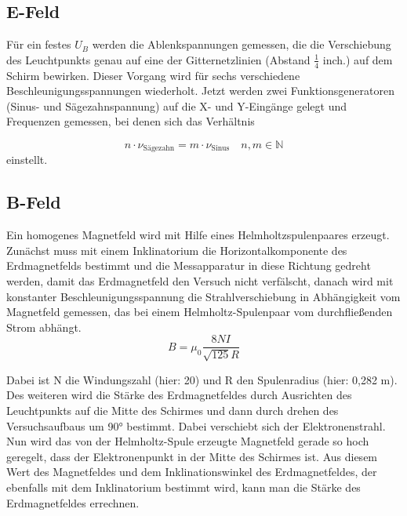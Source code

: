 
\subsection{E-Feld}

Für ein festes $U_B$ werden die Ablenkspannungen gemessen, die die Verschiebung des Leuchtpunkts genau auf eine der Gitternetzlinien (Abstand $\frac{1}{4}$ inch.) auf dem Schirm bewirken. Dieser Vorgang wird für
sechs verschiedene Beschleunigungsspannungen wiederholt.
Jetzt werden zwei Funktionsgeneratoren (Sinus- und Sägezahnspannung) auf die X- und Y-Eingänge gelegt und Frequenzen gemessen, bei denen sich das Verhältnis 

\begin{equation}
\label{eq:Theorie_freqVerhältnis}
n \cdot \nu_\text{Sägezahn} = m \cdot \nu_\text{Sinus} \quad n, m\in\mathbb{N}
\end{equation}
einstellt.

\subsection{B-Feld}

Ein homogenes Magnetfeld wird mit Hilfe eines Helmholtzspulenpaares erzeugt. Zunächst muss
mit einem Inklinatorium die Horizontalkomponente des Erdmagnetfelds bestimmt und die
Messapparatur in diese Richtung gedreht werden, damit das Erdmagnetfeld den Versuch nicht verfälscht,
danach wird mit konstanter Beschleunigungsspannung die Strahlverschiebung in Abhängigkeit vom Magnetfeld gemessen, das bei einem Helmholtz-Spulenpaar vom durchfließenden Strom abhängt.
\begin{equation}
\label{eq:Theorie_Magnetfeld}
B = \mu_0\frac{8 N I}{\sqrt{125}R}
\end{equation}

Dabei ist N die Windungszahl (hier: 20) und R den Spulenradius (hier: 0,282 m).
Des weiteren wird die Stärke des Erdmagnetfeldes durch Ausrichten des Leuchtpunkts auf die Mitte des Schirmes und dann durch drehen des Versuchsaufbaus um 90° bestimmt. Dabei verschiebt sich der Elektronenstrahl. Nun wird das von der Helmholtz-Spule erzeugte Magnetfeld
gerade so hoch geregelt, dass der Elektronenpunkt in der Mitte des Schirmes ist. Aus diesem Wert des Magnetfeldes und dem Inklinationswinkel des Erdmagnetfeldes, der ebenfalls mit dem Inklinatorium bestimmt wird, kann man die Stärke des Erdmagnetfeldes errechnen.
